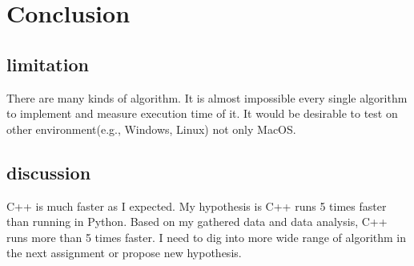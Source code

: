 \documentclass[11pt, a4paper]{article}
\begin{document}
\section{Conclusion}
\subsection{limitation}
There are many kinds of algorithm. It is almost impossible every single algorithm to implement and measure execution time of it. It would be desirable to test on other environment(e.g., Windows, Linux) not only MacOS. 
\subsection{discussion}
C++ is much faster as I expected. My hypothesis is C++ runs 5 times faster than running in Python. Based on my gathered data and data analysis, C++ runs more than 5 times faster. I need to dig into more wide range of algorithm in the next assignment or propose new hypothesis.
\end{document}
